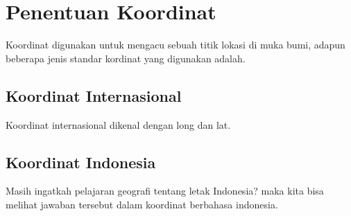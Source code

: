 \section{Penentuan Koordinat}
Koordinat digunakan untuk mengacu sebuah titik lokasi di muka bumi, adapun beberapa jenis standar kordinat yang digunakan adalah.

\subsection{Koordinat Internasional}
Koordinat internasional dikenal dengan long dan lat.


\subsection{Koordinat Indonesia}
Masih ingatkah pelajaran geografi tentang letak Indonesia? maka kita bisa melihat jawaban tersebut dalam koordinat berbahasa indonesia.
